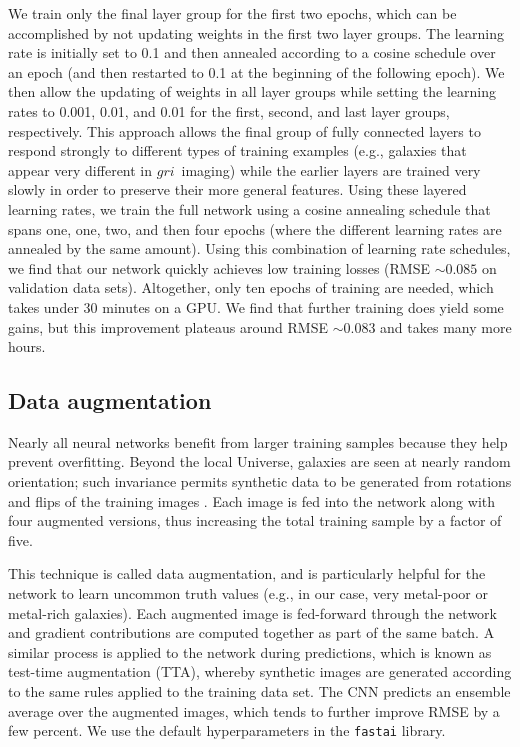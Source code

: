 \documentclass[fleqn,usenatbib]{mnras}
\newcommand{\sdssg}{\hbox{$g$}}
\newcommand{\sdssr}{\hbox{$r$}}
\newcommand{\sdssi}{\hbox{$i$}}
\newcommand{\eg}{e.g.}
\begin{document}
We train only the final layer group for the first two epochs, which can be accomplished by not updating weights in the first two layer groups. The learning rate is initially set to 0.1 and then annealed according to a cosine schedule over an epoch (and then restarted to 0.1 at the beginning of the following epoch). We then allow the updating of weights in all layer groups while setting the learning rates to 0.001, 0.01, and 0.01 for the first, second, and last layer groups, respectively. This approach allows the final group of fully connected layers to respond strongly to different types of training examples (\eg, galaxies that appear very different in \sdssg\sdssr\sdssi\ imaging) while the earlier layers are trained very slowly in order to preserve their more general features. Using these layered learning rates, we train the full network using a cosine annealing schedule that spans one, one, two, and then four epochs (where the different learning rates are annealed by the same amount). Using this combination of learning rate schedules, we find that our network quickly achieves low training losses (RMSE $\sim 0.085$ on validation data sets). Altogether, only ten epochs of training are needed, which takes under 30 minutes on a GPU. We find that further training does yield some gains, but this improvement plateaus around RMSE $\sim 0.083$ and takes many more hours.

\subsection{Data augmentation}\label{sec:data aug}
Nearly all neural networks benefit from larger training samples because they help prevent overfitting. Beyond the local Universe, galaxies are seen at nearly random orientation; such invariance permits synthetic data to be generated from rotations and flips of the training images \citep[see, \eg,][]{2014arXiv1409.1556S}. Each image is fed into the network along with four augmented versions, thus increasing the total training sample by a factor of five.

This technique is called data augmentation, and is particularly helpful for the network to learn uncommon truth values (\eg, in our case, very metal-poor or metal-rich galaxies). Each augmented image is fed-forward through the network and gradient contributions are computed together as part of the same batch. A similar process is applied to the network during predictions, which is known as test-time augmentation (TTA), whereby synthetic images are generated according to the same rules applied to the training data set. The CNN predicts an ensemble average over the augmented images, which tends to further improve RMSE by a few percent. We use the default hyperparameters in the \texttt{fastai} library.

\bsp	%
\label{lastpage}
\end{document}
